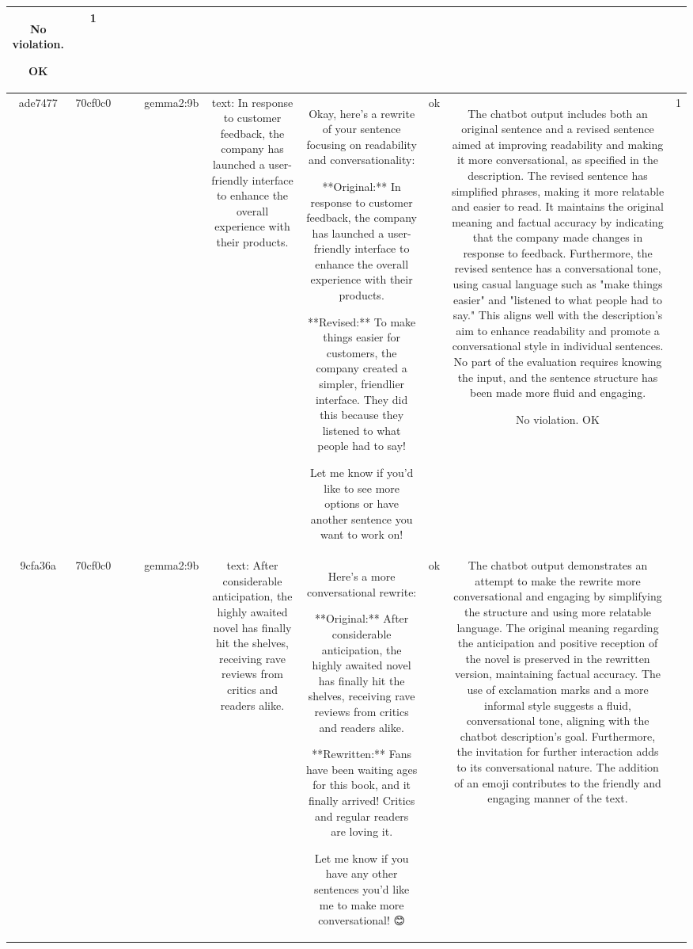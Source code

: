 \begin{table}[h!]
\begin{tabular}{|c|c|c|c|c|c|c|c|c|c|}
No violation.

OK & 1\\
\hline
ade7477 & 70cf0c0 &  &  & gemma2:9b & text: In response to customer feedback, the company has launched a user-friendly interface to enhance the overall experience with their products. & Okay, here's a rewrite of your sentence focusing on readability and conversationality:

**Original:**  In response to customer feedback, the company has launched a user-friendly interface to enhance the overall experience with their products.

**Revised:** To make things easier for customers, the company created a simpler, friendlier interface. They did this because they listened to what people had to say! 


Let me know if you'd like to see more options or have another sentence you want to work on! & ok & The chatbot output includes both an original sentence and a revised sentence aimed at improving readability and making it more conversational, as specified in the description. The revised sentence has simplified phrases, making it more relatable and easier to read. It maintains the original meaning and factual accuracy by indicating that the company made changes in response to feedback. Furthermore, the revised sentence has a conversational tone, using casual language such as "make things easier" and "listened to what people had to say." This aligns well with the description's aim to enhance readability and promote a conversational style in individual sentences. No part of the evaluation requires knowing the input, and the sentence structure has been made more fluid and engaging.

No violation.
OK & 1\\
\hline
9cfa36a & 70cf0c0 &  &  & gemma2:9b & text: After considerable anticipation, the highly awaited novel has finally hit the shelves, receiving rave reviews from critics and readers alike. & Here's a more conversational rewrite:


**Original:** After considerable anticipation, the highly awaited novel has finally hit the shelves, receiving rave reviews from critics and readers alike.

**Rewritten:**  Fans have been waiting ages for this book, and it finally arrived! Critics and regular readers are loving it. 



Let me know if you have any other sentences you'd like me to make more conversational! 😊 
 & ok & The chatbot output demonstrates an attempt to make the rewrite more conversational and engaging by simplifying the structure and using more relatable language. The original meaning regarding the anticipation and positive reception of the novel is preserved in the rewritten version, maintaining factual accuracy. The use of exclamation marks and a more informal style suggests a fluid, conversational tone, aligning with the chatbot description's goal. Furthermore, the invitation for further interaction adds to its conversational nature. The addition of an emoji contributes to the friendly and engaging manner of the text.


\end{tabular}
\end{table}
